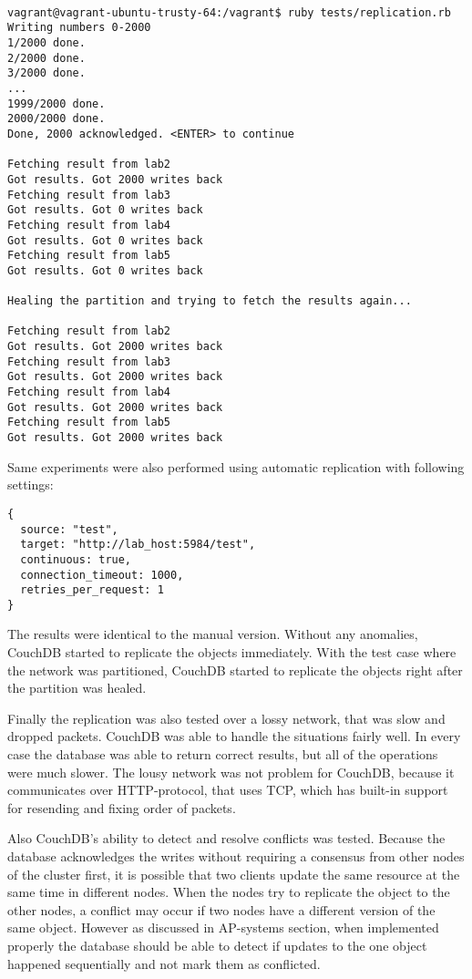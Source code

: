 \begin{lstlisting}[caption={CouchDB replication with partitioned
network},label={listing-partition}]

vagrant@vagrant-ubuntu-trusty-64:/vagrant$ ruby tests/replication.rb
Writing numbers 0-2000
1/2000 done.
2/2000 done.
3/2000 done.
...
1999/2000 done.
2000/2000 done.
Done, 2000 acknowledged. <ENTER> to continue

Fetching result from lab2
Got results. Got 2000 writes back
Fetching result from lab3
Got results. Got 0 writes back
Fetching result from lab4
Got results. Got 0 writes back
Fetching result from lab5
Got results. Got 0 writes back

Healing the partition and trying to fetch the results again...

Fetching result from lab2
Got results. Got 2000 writes back
Fetching result from lab3
Got results. Got 2000 writes back
Fetching result from lab4
Got results. Got 2000 writes back
Fetching result from lab5
Got results. Got 2000 writes back
\end{lstlisting}

Same experiments were also performed using automatic replication with following
settings:

\begin{verbatim}
{
  source: "test",
  target: "http://lab_host:5984/test",
  continuous: true,
  connection_timeout: 1000,
  retries_per_request: 1
}
\end{verbatim}

The results were identical to the manual version. Without any anomalies, CouchDB
started to replicate the objects immediately. With the test case where the
network was partitioned, CouchDB started to replicate the objects right after
the partition was healed.

Finally the replication was also tested over a lossy network, that was slow and
dropped packets. CouchDB was able to handle the situations fairly well. In every
case the database was able to return correct results, but all of the operations
were much slower. The lousy network was not problem for CouchDB, because it
communicates over HTTP-protocol, that uses TCP, which has built-in support for
resending and fixing order of packets.

Also CouchDB's ability to detect and resolve conflicts was tested. Because
the database acknowledges the writes without requiring a consensus from other
nodes of the cluster first, it is possible that two clients update the same
resource at the same time in different nodes. When the nodes try to replicate
the object to the other nodes, a conflict may occur if two nodes have a
different version of the same object. However as discussed in AP-systems
section, when implemented properly the database should be able to detect if
updates to the one object happened sequentially and not mark them as conflicted.


